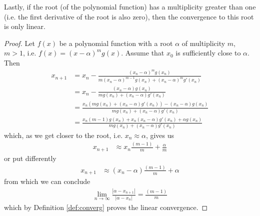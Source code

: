 \documentclass[
  digital, %
  notable,   %
  nolof,     %
  nolot,     %
	final, %
]{fithesis3}
\begin{document}
Lastly, if the root (of the polynomial function) has a multiplicity greater than one (i.e. the first derivative of the root is also zero), then the convergence to this root is only linear.
\begin{proof}
Let $f(x)$ be a polynomial function with a root $\alpha$ of multiplicity $m$, $m > 1$, i.e. $f(x) = (x-\alpha)^{m}g(x)$. Assume that $x_{0}$ is sufficiently close to $\alpha$. Then
\begin{align}
x_{n+1} &= x_{n} - \frac{(x_{n} - \alpha)^{m}g(x_{n})}{m(x_{n}-\alpha)^{m-1}g(x_{n}) + (x_{n}-\alpha)^{m}g'(x_{n})} \\
&= x_{n} - \frac{(x_{n} - \alpha)g(x_{n})}{mg(x_{n}) + (x_{n}-\alpha)g'(x_{n})} \\
&= \frac{x_{n}(mg(x_{n}) + (x_{n}-\alpha)g'(x_{n})) - (x_{n} - \alpha)g(x_{n})}{mg(x_{n}) + (x_{n}-\alpha)g'(x_{n})} \\
&= \frac{x_{n}(m - 1)g(x_{n}) + x_{n}(x_{n}-\alpha)g'(x_{n}) + {\alpha}g(x_{n})}{mg(x_{n}) + (x_{n}-\alpha)g'(x_{n})}
\end{align}
which, as we get closer to the root, i.e. $x_{n} \approx \alpha$, gives us
\begin{align}
x_{n+1} &\approx x_{n}\frac{(m - 1)}{m}+\frac{\alpha}{m}
\end{align}
or put differently
\begin{align}
x_{n+1} &\approx (x_{n}-\alpha)\frac{(m - 1)}{m}+\alpha
\end{align}
from which we can conclude
\begin{align}
\lim_{n\to\infty}\frac{\left|\alpha - x_{n+1}\right|}{\left|\alpha-x_{n}\right|} = \frac{(m - 1)}{m}
\end{align}
which by Definition \ref{def:converg} proves the linear convergence.
\end{proof}
\end{document}
